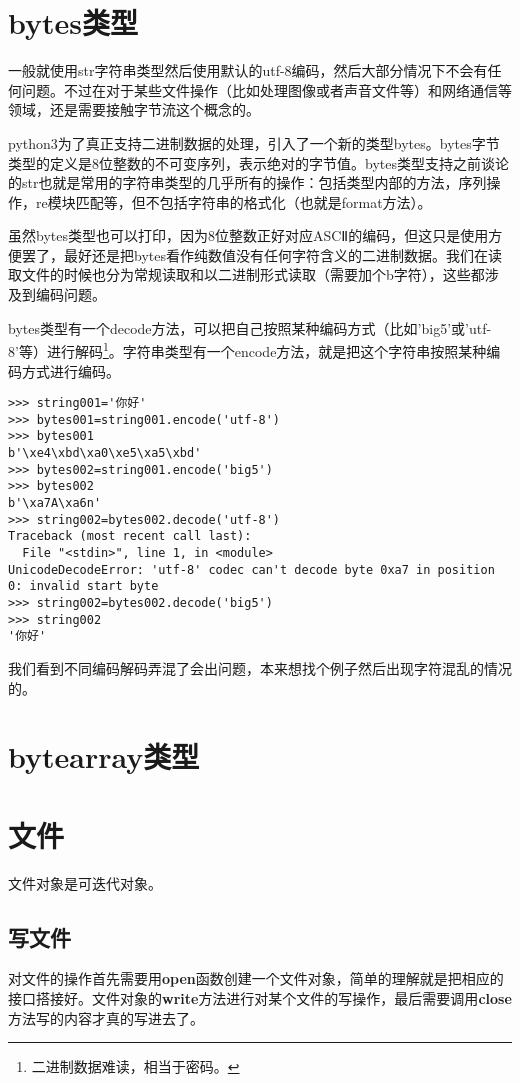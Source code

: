 \documentclass[12pt,oneside]{book}
\begin{document}
\begin{common-format}
\section{bytes类型}
一般就使用str字符串类型然后使用默认的utf-8编码，然后大部分情况下不会有任何问题。不过在对于某些文件操作（比如处理图像或者声音文件等）和网络通信等领域，还是需要接触字节流这个概念的。

python3为了真正支持二进制数据的处理，引入了一个新的类型bytes。bytes字节类型的定义是8位整数的不可变序列，表示绝对的字节值。bytes类型支持之前谈论的str也就是常用的字符串类型的几乎所有的操作：包括类型内部的方法，序列操作，re模块匹配等，但不包括字符串的格式化（也就是format方法）。

虽然bytes类型也可以打印，因为8位整数正好对应ASCⅡ的编码，但这只是使用方便罢了，最好还是把bytes看作纯数值没有任何字符含义的二进制数据。我们在读取文件的时候也分为常规读取和以二进制形式读取（需要加个b字符），这些都涉及到编码问题。

bytes类型有一个decode方法，可以把自己按照某种编码方式（比如'big5'或'utf-8'等）进行解码\footnote{二进制数据难读，相当于密码。}。字符串类型有一个encode方法，就是把这个字符串按照某种编码方式进行编码。
\begin{Verbatim}
>>> string001='你好'
>>> bytes001=string001.encode('utf-8')
>>> bytes001
b'\xe4\xbd\xa0\xe5\xa5\xbd'
>>> bytes002=string001.encode('big5')
>>> bytes002
b'\xa7A\xa6n'
>>> string002=bytes002.decode('utf-8')
Traceback (most recent call last):
  File "<stdin>", line 1, in <module>
UnicodeDecodeError: 'utf-8' codec can't decode byte 0xa7 in position 0: invalid start byte
>>> string002=bytes002.decode('big5')
>>> string002
'你好'
\end{Verbatim}

我们看到不同编码解码弄混了会出问题，本来想找个例子然后出现字符混乱的情况的。


\section{bytearray类型}


\section{文件}
文件对象是可迭代对象。

\subsection{写文件}
对文件的操作首先需要用\textbf{open}函数创建一个文件对象，简单的理解就是把相应的接口搭接好。文件对象的\textbf{write}方法进行对某个文件的写操作，最后需要调用\textbf{close}方法写的内容才真的写进去了。


\end{common-format}
\end{document}

